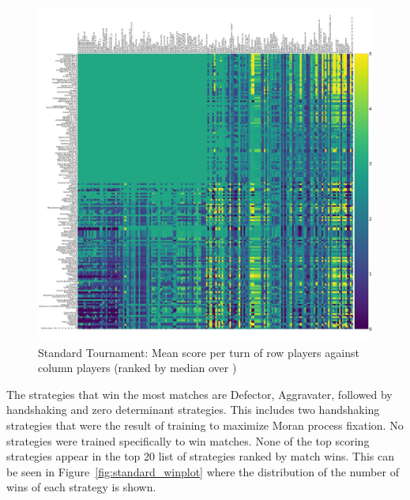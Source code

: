 \documentclass{article}
\begin{document}
\begin{figure}[!hbtp]
    \centering
    \includegraphics[width=\textwidth]{./assets/standard_scores_heatmap.pdf}
    \caption{Standard Tournament: Mean score per turn of row players against
    column players (ranked by median over
        \protecttournaments)}
    \label{fig:standard_heatmap}
\end{figure}

The strategies that win the most matches are Defector, Aggravater, followed by
handshaking and zero determinant strategies. This includes two handshaking
strategies that were the result of training to maximize Moran process fixation.
No strategies were trained specifically to win matches. None of the top scoring
strategies appear in the top 20 list of strategies ranked by match wins.
This can be seen in Figure~\ref{fig:standard_winplot} where the distribution of
the number of wins of each strategy is shown.
\end{document}

